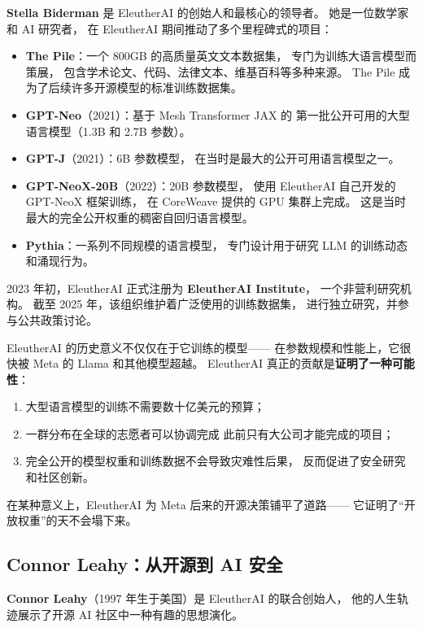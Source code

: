 \textbf{Stella Biderman} 是 EleutherAI 的创始人和最核心的领导者。
她是一位数学家和 AI 研究者，
在 EleutherAI 期间推动了多个里程碑式的项目：

\begin{itemize}[noitemsep]
  \item \textbf{The Pile}：一个 800GB 的高质量英文文本数据集，
    专门为训练大语言模型而策展，
    包含学术论文、代码、法律文本、维基百科等多种来源。
    The Pile 成为了后续许多开源模型的标准训练数据集。
  \item \textbf{GPT-Neo}（2021）：基于 Mesh Transformer JAX 的
    第一批公开可用的大型语言模型（1.3B 和 2.7B 参数）。
  \item \textbf{GPT-J}（2021）：6B 参数模型，
    在当时是最大的公开可用语言模型之一。
  \item \textbf{GPT-NeoX-20B}（2022）：20B 参数模型，
    使用 EleutherAI 自己开发的 GPT-NeoX 框架训练，
    在 CoreWeave 提供的 GPU 集群上完成。
    这是当时最大的完全公开权重的稠密自回归语言模型。
  \item \textbf{Pythia}：一系列不同规模的语言模型，
    专门设计用于研究 LLM 的训练动态和涌现行为。
\end{itemize}

2023 年初，EleutherAI 正式注册为 \textbf{EleutherAI Institute}，
一个非营利研究机构。
截至 2025 年，该组织维护着广泛使用的训练数据集，
进行独立研究，并参与公共政策讨论。

\begin{whybox}
EleutherAI 的历史意义不仅仅在于它训练的模型——
在参数规模和性能上，它很快被 Meta 的 Llama 和其他模型超越。
EleutherAI 真正的贡献是\textbf{证明了一种可能性}：
\begin{enumerate}
  \item 大型语言模型的训练不需要数十亿美元的预算；
  \item 一群分布在全球的志愿者可以协调完成
    此前只有大公司才能完成的项目；
  \item 完全公开的模型权重和训练数据不会导致灾难性后果，
    反而促进了安全研究和社区创新。
\end{enumerate}
在某种意义上，EleutherAI 为 Meta 后来的开源决策铺平了道路——
它证明了``开放权重''的天不会塌下来。
\end{whybox}

\subsection{Connor Leahy：从开源到 AI 安全}

\textbf{Connor Leahy}（1997 年生于美国）是 EleutherAI 的联合创始人，
他的人生轨迹展示了开源 AI 社区中一种有趣的思想演化。

